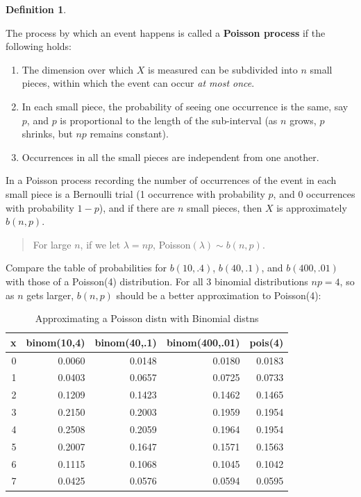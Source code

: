 \documentclass[
]{book}
\providecommand{\tightlist}{%
  \setlength{\itemsep}{0pt}\setlength{\parskip}{0pt}}
\theoremstyle{definition}
\newtheorem{definition}{Definition}[chapter]
\theoremstyle{definition}
\theoremstyle{definition}
\theoremstyle{definition}
\theoremstyle{remark}
\begin{document}
\begin{definition}
\protect\hypertarget{def:def-pois-process-R}{}\label{def:def-pois-process-R}

The process by which an event happens is called a \textbf{Poisson process} if the following holds:

\begin{enumerate}
\def\labelenumi{\arabic{enumi}.}
\tightlist
\item
  The dimension over which \(X\) is measured can be subdivided into \(n\) small pieces, within which the event can occur \emph{at most once}.
\item
  In each small piece, the probability of seeing one occurrence is the same, say \(p\), and \(p\) is proportional to the length of the sub-interval (as \(n\) grows, \(p\) shrinks, but \(np\) remains constant).
\item
  Occurrences in all the small pieces are independent from one another.
\end{enumerate}

\end{definition}

In a Poisson process recording the number of occurrences of the event in each small piece is a Bernoulli trial (1 occurrence with probability \(p\), and 0 occurrences with probability \(1-p\)), and if there are \(n\) small pieces, then \(X\) is approximately \(b(n,p)\).

\begin{quote}
For large \(n\), if we let \(\lambda = np\), Poisson\((\lambda)\sim b(n,p)\).
\end{quote}

Compare the table of probabilities for \(b(10,.4)\), \(b(40,.1)\), and \(b(400,.01)\) with those of a Poisson(4) distribution. For all 3 binomial distributions \(np = 4\), so as \(n\) gets larger, \(b(n,p)\) should be a better approximation to Poisson(4):

\begin{table}
\centering
\caption{\label{tab:unnamed-chunk-166}Approximating a Poisson distn with Binomial distns}
\centering
\begin{tabular}[t]{r|r|r|r|r}
\hline
x & binom(10,4) & binom(40,.1) & binom(400,.01) & pois(4)\\
\hline
0 & 0.0060 & 0.0148 & 0.0180 & 0.0183\\
\hline
1 & 0.0403 & 0.0657 & 0.0725 & 0.0733\\
\hline
2 & 0.1209 & 0.1423 & 0.1462 & 0.1465\\
\hline
3 & 0.2150 & 0.2003 & 0.1959 & 0.1954\\
\hline
4 & 0.2508 & 0.2059 & 0.1964 & 0.1954\\
\hline
5 & 0.2007 & 0.1647 & 0.1571 & 0.1563\\
\hline
6 & 0.1115 & 0.1068 & 0.1045 & 0.1042\\
\hline
7 & 0.0425 & 0.0576 & 0.0594 & 0.0595\\
\hline
\end{tabular}
\end{table}
\end{document}
